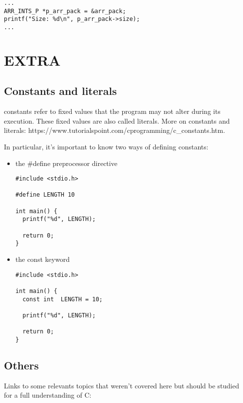 \documentclass[11pt]{article}
\begin{document}
\begin{lstlisting}[numbers=none]
...
ARR_INTS_P *p_arr_pack = &arr_pack;
printf("Size: %d\n", p_arr_pack->size);
...
\end{lstlisting}


\section{EXTRA}

\subsection{Constants and literals}

constants refer to fixed values that the program may not alter during its execution. These fixed values are also called literals. More on constants and literals: https://www.tutorialspoint.com/cprogramming/c\_constants.htm.

In particular, it's important to know two ways of defining constants:

\begin{itemize}
\item the \#define preprocessor directive

\begin{lstlisting}
#include <stdio.h>

#define LENGTH 10

int main() {
  printf("%d", LENGTH);

  return 0;
}
\end{lstlisting}

\item the const keyword

\begin{lstlisting}
#include <stdio.h>

int main() {
  const int  LENGTH = 10;

  printf("%d", LENGTH);

  return 0;
}
\end{lstlisting}
\end{itemize}


\subsection{Others}

Links to some relevants topics that weren't covered here but should be studied for a full understanding of C:

\ \\
\end{document}
